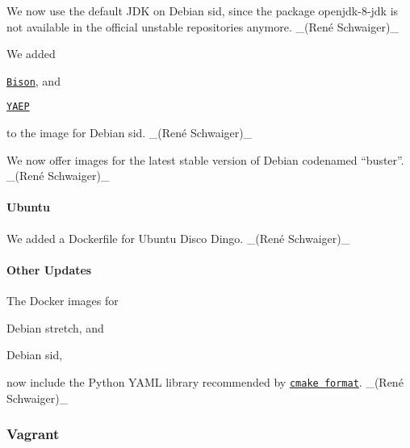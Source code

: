 \begin{DoxyItemize}
\item We now use the default J\+DK on Debian sid, since the package {\ttfamily openjdk-\/8-\/jdk} is not available in the official unstable repositories anymore. \+\_\+(René Schwaiger)\+\_\+
\item We added
\begin{DoxyItemize}
\item \href{https://www.gnu.org/software/bison/}{\tt Bison}, and
\item \href{https://github.com/vnmakarov/yaep}{\tt Y\+A\+EP}
\end{DoxyItemize}

to the image for Debian sid. \+\_\+(René Schwaiger)\+\_\+
\item We now offer images for the latest stable version of Debian codenamed “buster”. \+\_\+(René Schwaiger)\+\_\+
\end{DoxyItemize}

\paragraph*{Ubuntu}


\begin{DoxyItemize}
\item We added a Dockerfile for Ubuntu Disco Dingo. \+\_\+(René Schwaiger)\+\_\+
\end{DoxyItemize}

\paragraph*{Other Updates}


\begin{DoxyItemize}
\item The Docker images for
\begin{DoxyItemize}
\item Debian stretch, and
\item Debian sid,
\end{DoxyItemize}

now include the Python Y\+A\+ML library recommended by \href{https://github.com/cheshirekow/cmake_format}{\tt cmake format}. \+\_\+(René Schwaiger)\+\_\+
\end{DoxyItemize}

\subsubsection*{Vagrant}


